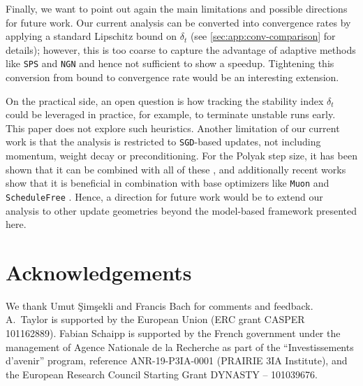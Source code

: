 \documentclass{article}
\newcommand{\SGD}{{\texttt{SGD}}}
\newcommand{\SPS}{{\texttt{SPS}}}
\newcommand{\NGN}{{\texttt{NGN}}}
\theoremstyle{plain}
\theoremstyle{definition}
\theoremstyle{remark}
\begin{document}
Finally, we want to point out again the main limitations and possible directions for future work.
Our current analysis can be converted into convergence rates by applying a standard Lipschitz bound on $\delta_t$ (see \cref{sec:app:conv-comparison} for details); however, this is too coarse to capture the advantage of adaptive methods like \SPS{} and \NGN{} and hence not sufficient to show a speedup. Tightening this conversion from bound to convergence rate would be an interesting extension.

On the practical side, an open question is how tracking the stability index $\delta_t$ could be leveraged in practice, for example, to terminate unstable runs early. This paper does not explore such heuristics. Another limitation of our current work is that the analysis is restricted to \SGD-based updates, not including momentum, weight decay or preconditioning. For the Polyak step size, it has been shown that it can be combined with all of these \citep{Schaipp2024a}, and additionally recent works show that it is beneficial in combination with base optimizers like \texttt{Muon} \citep{Crawshaw2025} and \texttt{ScheduleFree} \citep{Defazio2026}. Hence, a direction for future work would be to extend our analysis to other update geometries beyond the model-based framework presented here.

\clearpage


\section*{Acknowledgements}
We thank Umut \c{S}im\c{s}ekli and Francis Bach for comments and feedback.
A.~Taylor is supported by the European Union (ERC grant CASPER 101162889). Fabian Schaipp is supported by the French government under the management of Agence Nationale de la Recherche as part of the “Investissements d’avenir” program,
reference ANR-19-P3IA-0001 (PRAIRIE 3IA Institute), and the
European Research Council Starting Grant DYNASTY – 101039676.
\end{document}
